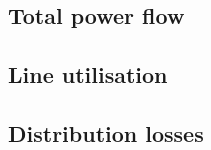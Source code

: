 

\subsection{Total power flow}
\label{ch1:subsec:total-power-flow}



\subsection{Line utilisation}
\label{ch1:subsec:line-utilisation}



\subsection{Distribution losses}
\label{ch1:subsec:losses}





